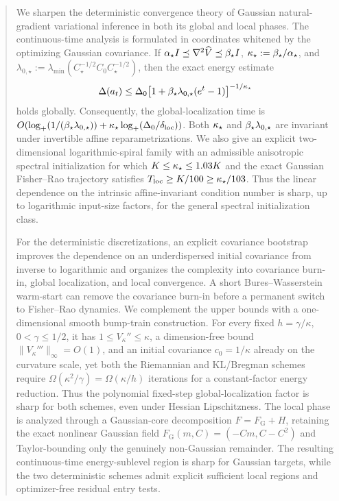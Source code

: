 \maketitle

\begin{abstract}
We sharpen the deterministic convergence theory of Gaussian natural-gradient variational
inference in both its global and local phases.  The continuous-time analysis is formulated in
coordinates whitened by the optimizing Gaussian covariance.  If
$\alphastar\Id\preceq\nabla^2\widehat V\preceq\betastar\Id$,
$\kappastar:=\betastar/\alphastar$, and
$\lambda_{0,\star}:=\lambda_{\min}(C_\star^{-1/2}C_0C_\star^{-1/2})$, then the exact energy estimate
\[
    \Delta(a_t)
    \leq
    \Delta_0\bigl[1+\betastar\lambda_{0,\star}(e^t-1)\bigr]^{-1/\kappastar}
\]
holds globally.  Consequently, the global-localization time is
$O(\logp(1/(\betastar\lambda_{0,\star}))+\kappastar\logp(\Delta_0/\delta_{\mathrm{loc}}))$.
Both $\kappastar$ and $\betastar\lambda_{0,\star}$ are invariant under invertible affine
reparametrizations.  We also give an explicit two-dimensional logarithmic-spiral family with an
admissible anisotropic spectral initialization for which
$K\leq\kappastar\leq1.03K$ and the exact Gaussian Fisher--Rao trajectory satisfies
$T_{\mathrm{loc}}\geq K/100\geq\kappastar/103$.  Thus the linear dependence on the intrinsic
affine-invariant condition number is sharp, up to logarithmic input-size factors, for the general
spectral initialization class.

For the deterministic discretizations, an explicit covariance bootstrap improves the dependence
on an underdispersed initial covariance from inverse to logarithmic and organizes the complexity
into covariance burn-in, global localization, and local convergence.  A short
Bures--Wasserstein warm-start can remove the covariance burn-in before a permanent switch to
Fisher--Rao dynamics.  We complement the upper bounds with a one-dimensional smooth bump-train
construction.  For every fixed $h=\gamma/\kappa$, $0<\gamma\leq1/2$, it has
$1\leq V_\kappa''\leq\kappa$, a dimension-free bound $\|V_\kappa'''\|_\infty=O(1)$, and an
initial covariance $c_0=1/\kappa$ already on the curvature scale, yet both the Riemannian and
KL/Bregman schemes require $\Omega(\kappa^2/\gamma)=\Omega(\kappa/h)$ iterations for a
constant-factor energy reduction.  Thus the polynomial fixed-step global-localization factor is
sharp for both schemes, even under Hessian Lipschitzness.  The local phase is analyzed through a
Gaussian-core decomposition $F=F_{\mathrm G}+H$, retaining the exact nonlinear Gaussian field
$F_{\mathrm G}(m,C)=(-Cm,C-C^2)$ and Taylor-bounding only the genuinely non-Gaussian remainder.
The resulting continuous-time energy-sublevel region is sharp for Gaussian targets, while the two
deterministic schemes admit explicit sufficient local regions and optimizer-free residual entry
tests.
\end{abstract}

